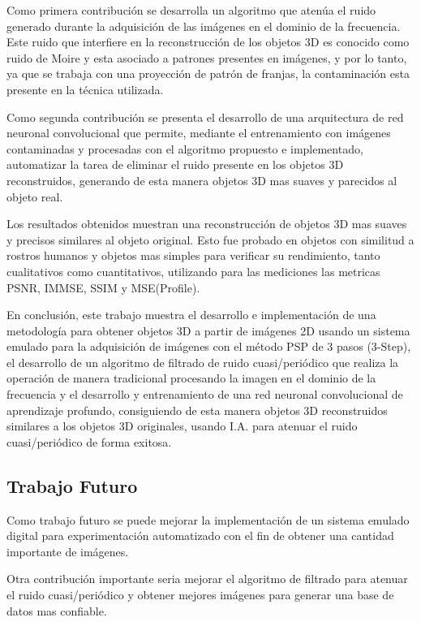\documentclass[10pt,letterpaper]{article}
\begin{document}
Como primera contribución se desarrolla un algoritmo que atenúa el ruido generado durante la adquisición de las imágenes en el dominio de la frecuencia. Este ruido que interfiere en la reconstrucción de los objetos 3D es conocido como ruido de Moire y esta asociado a patrones presentes en imágenes, y por lo tanto, ya que se trabaja con una proyección de patrón de franjas, la contaminación esta presente en la técnica utilizada.

Como segunda contribución se presenta el desarrollo de una arquitectura de red neuronal convolucional que permite, mediante el entrenamiento con imágenes contaminadas y procesadas con el algoritmo propuesto e implementado, automatizar la tarea de eliminar el ruido presente en los objetos 3D reconstruidos, generando de esta manera objetos 3D mas suaves y parecidos al objeto real.

Los resultados obtenidos muestran una reconstrucción de objetos 3D mas suaves y precisos similares al objeto original. Esto fue probado en objetos con similitud a rostros humanos y objetos mas simples para verificar su rendimiento, tanto cualitativos como cuantitativos, utilizando para las mediciones las metricas PSNR, IMMSE, SSIM y MSE(Profile).

En conclusión, este trabajo muestra el desarrollo e implementación de una metodología para obtener objetos 3D a partir de imágenes 2D usando un sistema emulado para la adquisición de imágenes con el método PSP de 3 pasos (3-Step), el desarrollo de un algoritmo de filtrado de ruido cuasi/periódico que realiza la operación de manera tradicional procesando la imagen en el dominio de la frecuencia y el desarrollo y entrenamiento de una red neuronal convolucional de aprendizaje profundo, consiguiendo de esta manera objetos 3D reconstruidos similares a los objetos 3D originales, usando I.A. para atenuar el ruido cuasi/periódico de forma exitosa.

\subsection{Trabajo Futuro}
Como trabajo futuro se puede mejorar la implementación de un sistema emulado digital para experimentación automatizado con el fin de obtener una cantidad importante de imágenes. 


Otra contribución importante seria mejorar el algoritmo de filtrado para atenuar el ruido cuasi/periódico y obtener mejores imágenes para generar una base de datos mas confiable.
\end{document}
